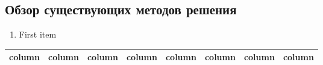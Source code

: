 \documentclass[./intro.tex]{subfiles}
\begin{document}
\subsection{Обзор существующих методов решения}
\begin{enumerate}
    \item First item
\end{enumerate}
\begin{center}
    \begin{tabular}{|c|c|c|c|c|c|c|c|}
        \hline
        column & column & column & column & column & column & column & column \\
        \hline
    \end{tabular}
\end{center}
\end{document}
